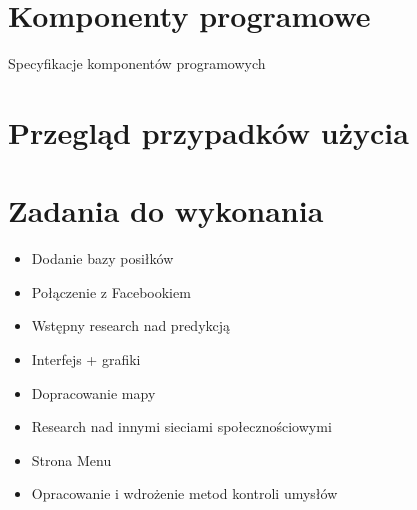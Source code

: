 \documentclass[a4paper,twoside,11pt]{article}
\begin{document}
\section{Komponenty programowe}
Specyfikacje komponentów programowych

\section{Przegląd przypadków użycia}

\section{Zadania do wykonania}
\begin{itemize}
  \item Dodanie bazy posiłków
  \item Połączenie z Facebookiem
  \item Wstępny research nad predykcją
  \item Interfejs + grafiki
  \item Dopracowanie mapy
  \item Research nad innymi sieciami społecznościowymi
  \item Strona Menu
  \item Opracowanie i wdrożenie metod kontroli umysłów
\end{itemize}
\end{document}
